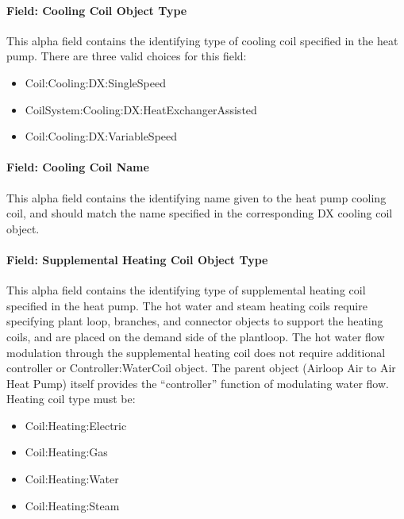 \paragraph{Field: Cooling Coil Object Type}\label{field-cooling-coil-object-type-3}

This alpha field contains the identifying type of cooling coil specified in the heat pump. There are three valid choices for this field:

\begin{itemize}
\item
  Coil:Cooling:DX:SingleSpeed
\item
  CoilSystem:Cooling:DX:HeatExchangerAssisted
\item
  Coil:Cooling:DX:VariableSpeed
\end{itemize}

\paragraph{Field: Cooling Coil Name}\label{field-cooling-coil-name-3}

This alpha field contains the identifying name given to the heat pump cooling coil, and should match the name specified in the corresponding DX cooling coil object.

\paragraph{Field: Supplemental Heating Coil Object Type}\label{field-supplemental-heating-coil-object-type-1}

This alpha field contains the identifying type of supplemental heating coil specified in the heat pump. The hot water and steam heating coils require specifying plant loop, branches, and connector objects to support the heating coils, and are placed on the demand side of the plantloop. The hot water flow modulation through the supplemental heating coil does not require additional controller or Controller:WaterCoil object. The parent object (Airloop Air to Air Heat Pump) itself provides the ``controller'' function of modulating water flow. Heating coil type must be:

\begin{itemize}
\item
  Coil:Heating:Electric
\item
  Coil:Heating:Gas
\item
  Coil:Heating:Water
\item
  Coil:Heating:Steam
\end{itemize}

